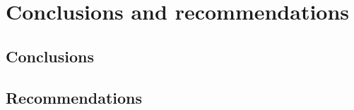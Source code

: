 \chapter{Conclusions and recommendations}\label{ch:conclusion}

\section*{Conclusions}
\lipsum[2]


\section*{Recommendations}
\lipsum[7]